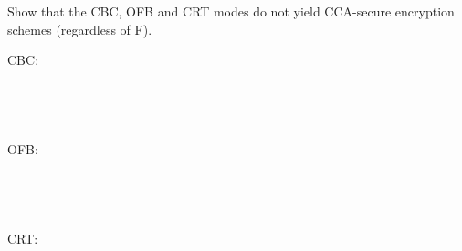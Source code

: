 \documentclass[12pt,letterpaper,boxed]{amspset}
\begin{document}
\begin{problem}[3.6]
Show that the CBC, OFB and CRT modes do not yield CCA-secure encryption schemes (regardless of F).
\end{problem}

\begin{solution}
CBC:\\
\\
\\
\\
\\
OFB:\\
\\
\\
\\
\\
CRT:\\
\\
\\
\\
\end{solution}
\end{document}
